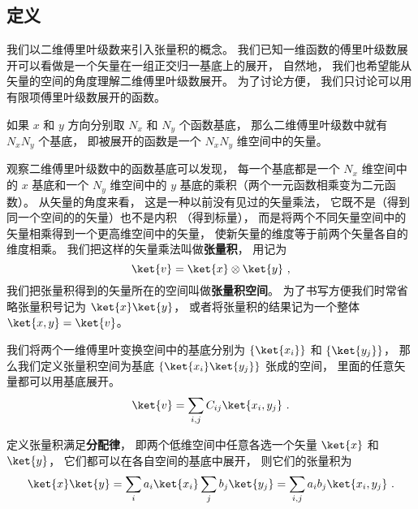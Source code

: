 

\subsection{定义}

我们以二维傅里叶级数来引入张量积的概念。 我们已知一维函数的傅里叶级数展开可以看做是一个矢量在一组正交归一基底上的展开， 自然地， 我们也希望能从矢量的空间的角度理解二维傅里叶级数展开。 为了讨论方便， 我们只讨论可以用有限项傅里叶级数展开的函数。

如果 $x$ 和 $y$ 方向分别取 $N_x$ 和 $N_y$ 个函数基底， 那么二维傅里叶级数中就有 $N_xN_y$ 个基底， 即被展开的函数是一个 $N_xN_y$ 维空间中的矢量。

观察二维傅里叶级数中的函数基底可以发现， 每一个基底都是一个 $N_x$ 维空间中的 $x$ 基底和一个 $N_y$ 维空间中的 $y$ 基底的乘积（两个一元函数相乘变为二元函数）。 从矢量的角度来看， 这是一种以前没有见过的矢量乘法， 它既不是（得到同一个空间的的矢量）也不是内积%
（得到标量）， 而是将两个不同矢量空间中的矢量相乘得到一个更高维空间中的矢量， 使新矢量的维度等于前两个矢量各自的维度相乘。 我们把这样的矢量乘法叫做\textbf{张量积}， 用记为
\begin{equation}
\ket{v} = \ket{x} \otimes \ket{y}~,
\end{equation}
我们把张量积得到的矢量所在的空间叫做\textbf{张量积空间}。 为了书写方便我们时常省略张量积号记为 $\ket{x}\ket{y}$， 或者将张量积的结果记为一个整体 $\ket{x, y} = \ket{v}$。

我们将两个一维傅里叶变换空间中的基底分别为 $\{\ket{x_i}\}$ 和 $\{\ket{y_j}\}$， 那么我们定义张量积空间为基底 $\{\ket{x_i}\ket{y_j}\}$ 张成的空间， 里面的任意矢量都可以用基底展开。
\begin{equation}
\ket{v} = \sum_{i,j} C_{ij}\ket{x_i, y_j}~.
\end{equation}

定义张量积满足\textbf{分配律}， 即两个低维空间中任意各选一个矢量 $\ket{x}$ 和 $\ket{y}$， 它们都可以在各自空间的基底中展开， 则它们的张量积为
\begin{equation}\label{eq_DirPro_2}
\ket{x}\ket{y} = \sum_i a_i\ket{x_i} \sum_j b_j\ket{y_j}
= \sum_{i,j} a_i b_j \ket{x_i, y_j}~.
\end{equation}

